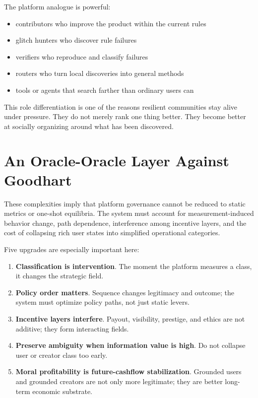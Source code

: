 \documentclass[11pt]{article}
\begin{document}
The platform analogue is powerful:

\begin{itemize}
  \item contributors who improve the product within the current rules
  \item glitch hunters who discover rule failures
  \item verifiers who reproduce and classify failures
  \item routers who turn local discoveries into general methods
  \item tools or agents that search farther than ordinary users can
\end{itemize}

This role differentiation is one of the reasons resilient communities stay alive under pressure. They do not merely rank one thing better. They become better at socially organizing around what has been discovered.

\section{An Oracle-Oracle Layer Against Goodhart}

These complexities imply that platform governance cannot be reduced to static metrics or one-shot equilibria. The system must account for measurement-induced behavior change, path dependence, interference among incentive layers, and the cost of collapsing rich user states into simplified operational categories.

Five upgrades are especially important here:

\begin{enumerate}
  \item \textbf{Classification is intervention}. The moment the platform measures a class, it changes the strategic field.
  \item \textbf{Policy order matters}. Sequence changes legitimacy and outcome; the system must optimize policy paths, not just static levers.
  \item \textbf{Incentive layers interfere}. Payout, visibility, prestige, and ethics are not additive; they form interacting fields.
  \item \textbf{Preserve ambiguity when information value is high}. Do not collapse user or creator class too early.
  \item \textbf{Moral profitability is future-cashflow stabilization}. Grounded users and grounded creators are not only more legitimate; they are better long-term economic substrate.
\end{enumerate}
\end{document}
